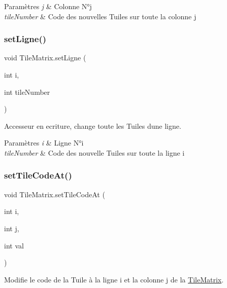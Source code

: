 \begin{DoxyParams}{Paramètres}
{\em j} & Colonne N°j \\
\hline
{\em tile\+Number} & Code des nouvelles Tuiles sur toute la colonne j \\
\hline
\end{DoxyParams}
\mbox{\label{class_tile_matrix_a1ff5f7a4550c1fb5214f8a2f3d585c88}} 
\subsubsection{\texorpdfstring{set\+Ligne()}{setLigne()}}
{\footnotesize\ttfamily void Tile\+Matrix.\+set\+Ligne (\begin{DoxyParamCaption}\item[{int}]{i,  }\item[{int}]{tile\+Number }\end{DoxyParamCaption})}



Accesseur en ecriture, change toute les Tuiles d\textquotesingle{}une ligne. 


\begin{DoxyParams}{Paramètres}
{\em i} & Ligne N°i \\
\hline
{\em tile\+Number} & Code des nouvelle Tuiles sur toute la ligne i \\
\hline
\end{DoxyParams}
\mbox{\label{class_tile_matrix_aa565334932b2541174e3601bf1fcaa0a}} 
\subsubsection{\texorpdfstring{set\+Tile\+Code\+At()}{setTileCodeAt()}}
{\footnotesize\ttfamily void Tile\+Matrix.\+set\+Tile\+Code\+At (\begin{DoxyParamCaption}\item[{int}]{i,  }\item[{int}]{j,  }\item[{int}]{val }\end{DoxyParamCaption})}



Modifie le code de la Tuile à la ligne i et la colonne j de la \hyperlink{class_tile_matrix}{Tile\+Matrix}. 



